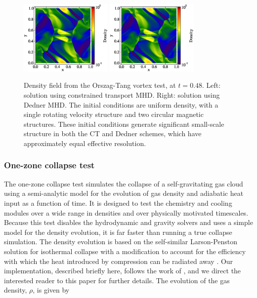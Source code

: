 \begin{figure}
\begin{center}
\includegraphics[width=0.4\textwidth]{figures/MHDCT_OrszagTang_Density.eps}
\includegraphics[width=0.4\textwidth]{figures/MHDDedner_OrszagTang_Density.eps}
\caption{Density field from the Orszag-Tang vortex test, at $t=0.48$.
Left: solution using constrained transport MHD.  Right: solution using
Dedner MHD. The initial conditions are uniform density, with a single
rotating velocity structure and two circular magnetic structures.
These initial conditions generate significant small-scale structure in
both the CT and Dedner schemes, which have approximately equal
effective resolution.}
\label{fig.orszag}
\end{center}
\end{figure}


\subsubsection{One-zone collapse test}
\label{sec.tests.1-zone}

The one-zone collapse test simulates the collapse of a
self-gravitating gas cloud using a semi-analytic model for the
evolution of gas density and adiabatic heat input as a function of
time.  It is designed to test the chemistry and cooling modules over a
wide range in densities and over physically motivated timescales.
Because this test disables the hydrodynamic and gravity solvers and
uses a simple model for the density evolution, it is far faster than
running a true collapse simulation.  The density evolution is based on
the self-similar Larson-Penston \citep{1969MNRAS.145..271L,
1969MNRAS.144..425P} solution for isothermal collapse with a
modification to account for the efficiency with which the heat
introduced by compression can be radiated away
\citep{1983ApJ...265.1047Y}.  Our implementation, described briefly
here, follows the work of \citet{2005ApJ...626..627O}, and we direct
the interested reader to this paper for further details.  The
evolution of the gas density, $\rho$, is given by

